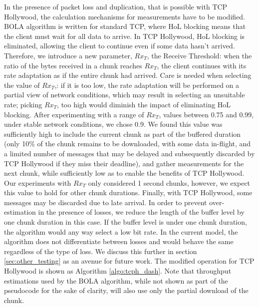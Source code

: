 In the presence of packet loss and duplication, that is possible with TCP Hollywood, the calculation 
mechanisms for measurements have to be modified. BOLA algorithm is written for standard TCP, where HoL blocking means that the client must wait for all data to arrive. In TCP Hollywood, HoL blocking is eliminated, allowing the client to continue even if some data hasn't arrived. Therefore, we introduce a new parameter, $Rx_{T}$, the Receive Threshold: when the ratio of the bytes received in a chunk reaches $Rx_{T}$, the client continues with its rate adaptation as if the entire chunk had arrived. Care is needed when selecting the value of $Rx_{T}$,: if it is too low, the rate adaptation will be performed on a partial view of network conditions, which may result in selecting an unsuitable rate; picking $Rx_{T}$, too high would diminish the impact of eliminating HoL blocking. After experimenting with a range of $Rx_{T}$, values between 0.75 and 0.99, under stable network conditions, we chose 0.9. We found this value was sufficiently high to include the current chunk as part of the buffered duration (only 10\% of the chunk remains to be downloaded, with some data in-flight, and a limited number of messages that may be delayed and subsequently discarded by TCP Hollywood if they miss their deadline), and gather measurements for the next chunk, while sufficiently low as to enable the benefits of TCP Hollywood. Our experiments with $Rx_{T}$ only considered 1 second chunks, however, we expect this value to hold for other chunk durations. Finally, with TCP Hollywood, some messages may be discarded due to late arrival. In order to prevent over-estimation in the presence of losses, we reduce the length of the buffer level by one chunk duration in this case. If the buffer level is under one chunk duration, the algorithm would any way select a low bit rate. In the current model, the algorithm does not differentiate between losses and would behave the same regardless of the type of loss. We discuss this further in section \ref{sec:other_testing} as an avenue for future work. The modified operation for TCP Hollywood is shown as Algorithm \ref{algo:tcph_dash}. Note that throughput estimations used by the BOLA algorithm, while not shown as part of the pseudocode for the sake of clarity, will also use only the partial download of the chunk. 

